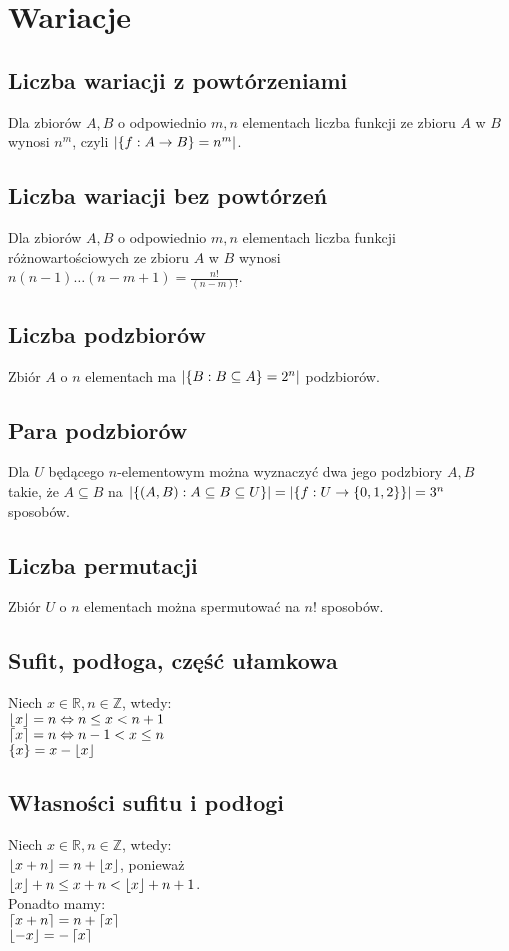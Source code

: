 \section{Wariacje}
\subsection*{Liczba wariacji z powtórzeniami}
Dla zbiorów $A, B$ o odpowiednio $m, n$ elementach liczba funkcji ze zbioru $A$ w $B$
wynosi $n^m$, czyli $\left| \{ f: A \to B \} = n^m \right|$.

\subsection*{Liczba wariacji bez powtórzeń}
Dla zbiorów $A, B$ o odpowiednio $m, n$ elementach liczba funkcji różnowartościowych
ze zbioru $A$ w $B$ wynosi $n (n - 1) \ldots (n - m + 1) = \frac{n!}{(n - m)!}$.

\subsection*{Liczba podzbiorów}
Zbiór $A$ o $n$ elementach ma $\left| \{ B : B \subseteq A \} = 2^n \right|$ podzbiorów.

\subsection*{Para podzbiorów}
Dla $U$ będącego $n$-elementowym można wyznaczyć dwa jego podzbiory $A, B$ takie,
że $A \subseteq B$ na $\left| \{ (A,B) : A \subseteq B \subseteq U \} \right| = 
\left| \{ f: U \to \{ 0, 1, 2 \} \} \right| = 3^n$ sposobów.

\subsection*{Liczba permutacji}
Zbiór $U$ o $n$ elementach można spermutować na $n!$ sposobów.

\subsection*{Sufit, podłoga, część ułamkowa}
Niech $x \in \mathbb{R}, n \in \mathbb{Z}$, wtedy: \\
$ \left\lfloor x \right\rfloor = n \Leftrightarrow n \leq x < n + 1 $ \\
$ \left\lceil x \right\rceil  = n \Leftrightarrow n - 1 < x \leq n $ \\
$ \left\{ x \right\} = x - \left\lfloor x \right\rfloor $

\subsection*{Własności sufitu i podłogi}
Niech $x \in \mathbb{R}, n \in \mathbb{Z}$, wtedy: \\
$ \left\lfloor x + n \right\rfloor = n + \left\lfloor x \right\rfloor $, ponieważ \\
$ \left\lfloor x \right\rfloor + n \leq x + n < \left\lfloor x \right\rfloor + n + 1 $. \\
Ponadto mamy: \\
$ \left\lceil x + n \right\rceil = n + \left\lceil x \right\rceil $ \\
$ \left\lfloor -x \right\rfloor = -\left\lceil x \right\rceil $

